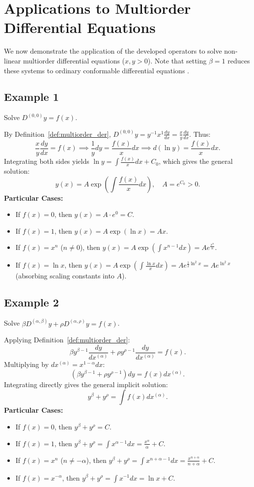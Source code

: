 \documentclass[oneside,10pt]{article}
\theoremstyle{plain}
\theoremstyle{definition}
\begin{document}
\section{Applications to Multiorder Differential Equations}\label{sec:applications}

We now demonstrate the application of the developed operators to solve non-linear multiorder differential equations ($x, y > 0$). Note that setting $\beta = 1$ reduces these systems to ordinary conformable differential equations \cite{Cadenas2025}.

\subsection{Example 1}
Solve $D^{(0,0)} y = f(x)$.

By Definition~\ref{def:multiorder_der}, $D^{(0,0)} y = y^{-1} x^1 \frac{dy}{dx} = \frac{x}{y} \frac{dy}{dx}$. Thus:
\[
\frac{x}{y} \frac{dy}{dx} = f(x) \implies \frac{1}{y} dy = \frac{f(x)}{x} dx \implies d(\ln y) = \frac{f(x)}{x} dx.
\]
Integrating both sides yields $\ln y = \int \frac{f(x)}{x} dx + C_0$, which gives the general solution:
\[
y(x) = A \exp\left( \int \frac{f(x)}{x} dx \right), \quad A = e^{C_0} > 0.
\]
\textbf{Particular Cases:}
\begin{itemize}
    \item If $f(x) = 0$, then $y(x) = A \cdot e^0 = C$.
    \item If $f(x) = 1$, then $y(x) = A \exp(\ln x) = A x$.
    \item If $f(x) = x^n$ ($n \neq 0$), then $y(x) = A \exp\left(\int x^{n-1} dx\right) = A e^{\frac{x^n}{n}}$.
    \item If $f(x) = \ln x$, then $y(x) = A \exp\left(\int \frac{\ln x}{x} dx\right) = A e^{\frac{1}{2}\ln^2 x} = A e^{\ln^2 x}$ (absorbing scaling constants into $A$).
\end{itemize}

\subsection{Example 2}
Solve $\beta D^{(\alpha,\beta)} y + \rho D^{(\alpha,\rho)} y = f(x)$.

Applying Definition~\ref{def:multiorder_der}:
\[
\beta y^{\beta-1} \frac{dy}{dx^{(\alpha)}} + \rho y^{\rho-1} \frac{dy}{dx^{(\alpha)}} = f(x).
\]
Multiplying by $dx^{(\alpha)} = x^{1-\alpha} dx$:
\[
\left( \beta y^{\beta-1} + \rho y^{\rho-1} \right) dy = f(x) dx^{(\alpha)}.
\]
Integrating directly gives the general implicit solution:
\[
y^\beta + y^\rho = \int f(x) dx^{(\alpha)}.
\]
\textbf{Particular Cases:}
\begin{itemize}
    \item If $f(x) = 0$, then $y^\beta + y^\rho = C$.
    \item If $f(x) = 1$, then $y^\beta + y^\rho = \int x^{\alpha-1} dx = \frac{x^\alpha}{\alpha} + C$.
    \item If $f(x) = x^n$ ($n \neq -\alpha$), then $y^\beta + y^\rho = \int x^{n+\alpha-1} dx = \frac{x^{n+\alpha}}{n+\alpha} + C$.
    \item If $f(x) = x^{-\alpha}$, then $y^\beta + y^\rho = \int x^{-1} dx = \ln x + C$.
\end{itemize}
\end{document}
